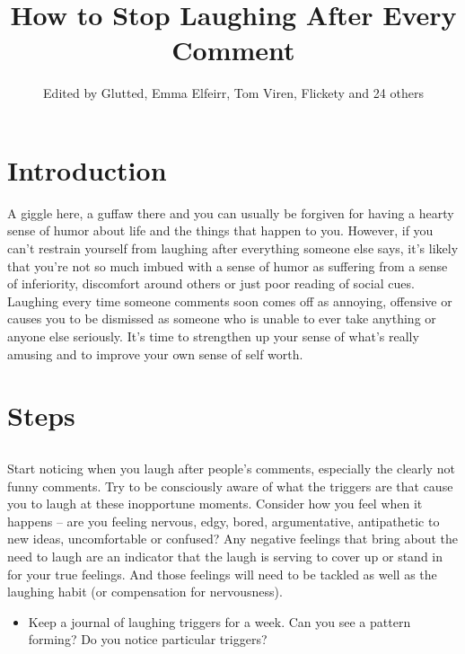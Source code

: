 \documentclass{article}
\title{How to Stop Laughing After Every Comment}
\author{Edited by Glutted, Emma Elfeirr, Tom Viren, Flickety and 24 others}
\begin{document}
\maketitle

\section{Introduction}
A giggle here, a guffaw there and you can usually be forgiven for having a hearty sense of humor about life and the things that happen to you. However, if you can't restrain yourself from laughing after everything someone else says, it's likely that you're not so much imbued with a sense of humor as suffering from a sense of inferiority, discomfort around others or just poor reading of social cues. Laughing every time someone comments soon comes off as annoying, offensive or causes you to be dismissed as someone who is unable to ever take anything or anyone else seriously. It's time to strengthen up your sense of what's really amusing and to improve your own sense of self worth.

\section{Steps}
\subsection{}
Start noticing when you laugh after people's comments, especially the clearly not funny comments. Try to be consciously aware of what the triggers are that cause you to laugh at these inopportune moments. Consider how you feel when it happens – are you feeling nervous, edgy, bored, argumentative, antipathetic to new ideas, uncomfortable or confused? Any negative feelings that bring about the need to laugh are an indicator that the laugh is serving to cover up or stand in for your true feelings. And those feelings will need to be tackled as well as the laughing habit (or compensation for nervousness).
\begin{itemize}
\item{Keep a journal of laughing triggers for a week. Can you see a pattern forming? Do you notice particular triggers?}
\end{itemize}
\end{document}
